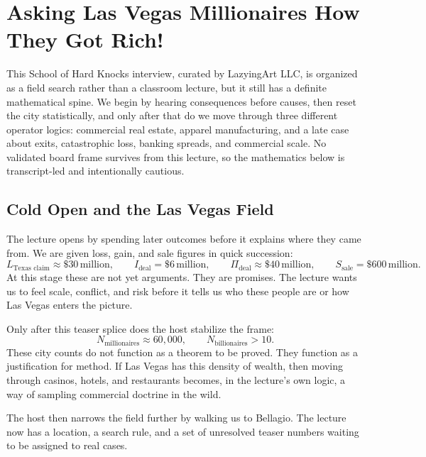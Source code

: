 \chapter{Asking Las Vegas Millionaires How They Got Rich!}

This School of Hard Knocks interview, curated by LazyingArt LLC, is organized as a field search rather than a classroom lecture, but it still has a definite mathematical spine. We begin by hearing consequences before causes, then reset the city statistically, and only after that do we move through three different operator logics: commercial real estate, apparel manufacturing, and a late case about exits, catastrophic loss, banking spreads, and commercial scale. No validated board frame survives from this lecture, so the mathematics below is transcript-led and intentionally cautious.

\section{Cold Open and the Las Vegas Field}

The lecture opens by spending later outcomes before it explains where they came from. We are given loss, gain, and sale figures in quick succession:
\begin{equation}
L_{\text{Texas claim}} \approx \$30\,\text{million},\qquad
I_{\text{deal}} = \$6\,\text{million},\qquad
\Pi_{\text{deal}} \approx \$40\,\text{million},\qquad
S_{\text{sale}} = \$600\,\text{million}.
\end{equation}
At this stage these are not yet arguments. They are promises. The lecture wants us to feel scale, conflict, and risk before it tells us who these people are or how Las Vegas enters the picture.

Only after this teaser splice does the host stabilize the frame:
\begin{equation}
N_{\text{millionaires}} \approx 60{,}000,\qquad
N_{\text{billionaires}} > 10.
\end{equation}
These city counts do not function as a theorem to be proved. They function as a justification for method. If Las Vegas has this density of wealth, then moving through casinos, hotels, and restaurants becomes, in the lecture's own logic, a way of sampling commercial doctrine in the wild.

The host then narrows the field further by walking us to Bellagio. The lecture now has a location, a search rule, and a set of unresolved teaser numbers waiting to be assigned to real cases.


